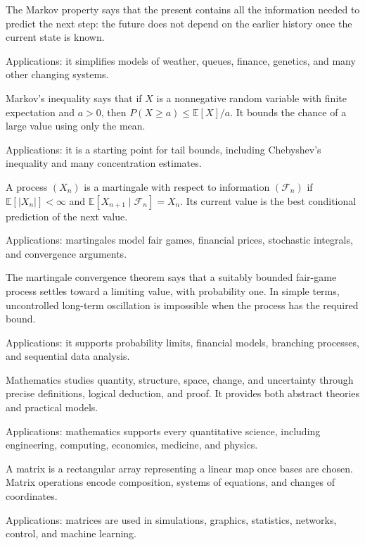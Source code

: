 The Markov property says that the present contains all the information needed to predict the next step: the future does not depend on the earlier history once the current state is known. \par\noindent Applications: it simplifies models of weather, queues, finance, genetics, and many other changing systems.

Markov's inequality says that if \(X\) is a nonnegative random variable with finite expectation and \(a>0\), then \(P(X\ge a)\le \mathbb{E}[X]/a\). It bounds the chance of a large value using only the mean. \par\noindent Applications: it is a starting point for tail bounds, including Chebyshev's inequality and many concentration estimates.

A process $(X_n)$ is a martingale with respect to information $(\mathcal F_n)$ if $\mathbb E[|X_n|]<\infty$ and $\mathbb E[X_{n+1}\mid\mathcal F_n]=X_n$. Its current value is the best conditional prediction of the next value. \par\noindent Applications: martingales model fair games, financial prices, stochastic integrals, and convergence arguments.

The martingale convergence theorem says that a suitably bounded fair-game process settles toward a limiting value, with probability one. In simple terms, uncontrolled long-term oscillation is impossible when the process has the required bound. \par\noindent Applications: it supports probability limits, financial models, branching processes, and sequential data analysis.

Mathematics studies quantity, structure, space, change, and uncertainty through precise definitions, logical deduction, and proof. It provides both abstract theories and practical models. \par\noindent Applications: mathematics supports every quantitative science, including engineering, computing, economics, medicine, and physics.

A matrix is a rectangular array representing a linear map once bases are chosen. Matrix operations encode composition, systems of equations, and changes of coordinates. \par\noindent Applications: matrices are used in simulations, graphics, statistics, networks, control, and machine learning.

